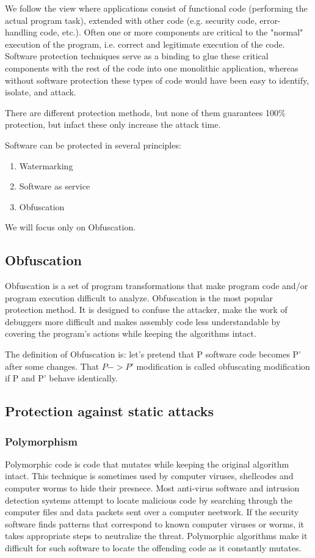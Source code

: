 \documentclass[a4paper,12pt]{article}
\begin{document}
We follow the view where applications consist of functional code (performing
the actual program task), extended with other code (e.g. security code,
error-handling code, etc.). Often one or more components are critical to the
"normal" execution of the program, i.e. correct and legitimate execution of
the code. Software protection techniques serve as a binding to glue these
critical components with the rest of the code into one monolithic application,
whereas without software protection these types of code would have been easy to
identify, isolate, and attack.

There are different protection methods, but none of them guarantees 100\%
protection, but infact these only increase the attack time.

Software can be protected in several principles:

\begin{enumerate}
\item Watermarking
\item Software as service
\item Obfuscation
\end{enumerate}

We will focus only on Obfuscation.

\subsection{Obfuscation}
Obfuscation is a set of program transformations
that make program code and/or program execution difficult to analyze.
Obfuscation is the most popular protection method. It is designed to confuse
the attacker, make the work of debuggers more difficult and makes assembly
code less understandable by covering the program's actions while keeping the
algorithms intact.

The definition of Obfuscation is: let's pretend that P software code becomes
P' after some changes. That $P -> P'$ modification is called
obfuscating modification if P and P' behave identically.

\subsection{Protection against static attacks}
\subsubsection{Polymorphism}
    Polymorphic code is code that mutates while keeping the original algorithm
    intact. This technique is sometimes used by computer viruses, shellcodes
    and computer worms to hide their presnece. Most anti-virus software and
    intrusion detection systems attempt to locate malicious code by searching
    through the computer files and data packets sent over a computer neetwork.
    If the security software finds patterns that correspond to known computer
    viruses or worms, it takes appropriate steps to neutralize the threat.
    Polymorphic algorithms make it difficult for such software to locate the
    offending code as it constantly mutates.
\end{document}
